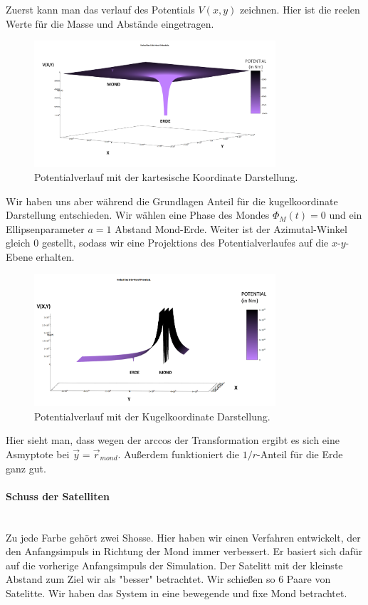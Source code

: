 \documentclass{subfiles}
\begin{document}
    Zuerst kann man das verlauf des Potentials $V(x,y)$ zeichnen. Hier ist die reelen Werte für die Masse und Abstände eingetragen.
    \begin{figure}[H]
        \centering
        \includegraphics[width=0.8\textwidth]{../Ressource/PotentialVerlauf2.png}
        \caption{Potentialverlauf mit der kartesische Koordinate Darstellung.}
        \label{fig:Potential}
    \end{figure}

    Wir haben uns aber während die Grundlagen Anteil für die kugelkoordinate Darstellung entschieden. Wir wählen eine Phase des Mondes
    $\Phi_M(t) = 0$ und ein Ellipsenparameter $a = 1$ Abstand Mond-Erde. Weiter ist der Azimutal-Winkel gleich 0 gestellt, sodass wir eine Projektions
    des Potentialverlaufes auf die $x$-$y$-Ebene erhalten.
    \begin{figure}[H]
        \centering
        \includegraphics[width=0.8\textwidth]{../Ressource/PotentialVerlaufKugel.png}
        \caption{Potentialverlauf mit der Kugelkoordinate Darstellung.}
        \label{fig:PotentialKugel}
    \end{figure}
    Hier sieht man, dass wegen der arccos der Transformation ergibt es sich eine Asmyptote bei $\vec{y} = \vec{r}_{mond}$. Außerdem 
    funktioniert die $1/r$-Anteil für die Erde ganz gut.
    \paragraph{Schuss der Satelliten}$~$\\
    Zu jede Farbe gehört zwei Shosse. Hier haben wir einen Verfahren entwickelt, der den Anfangsimpuls in Richtung der Mond immer verbessert. Er basiert sich
    dafür auf die vorherige Anfangsimpuls der Simulation. Der Satelitt mit der kleinste Abstand zum Ziel wir als "besser" betrachtet.
    Wir schießen so 6 Paare von Satelitte. Wir haben das System in eine bewegende und fixe Mond betrachtet.\newline
\end{document}

